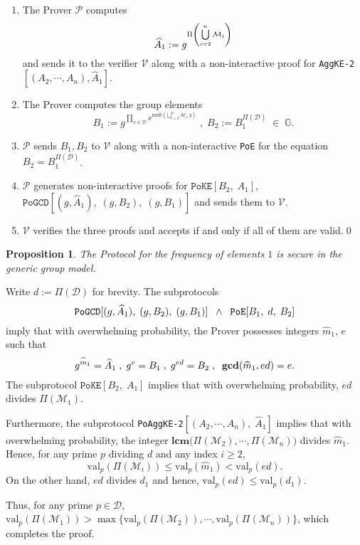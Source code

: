 \documentclass[11pt, lettersize, notitlepage, leqno, footskip=0.6cm]{article}
\newcommand{\pl}{\prod\limits}
\newcommand{\ttt}{\texttt}
\newcommand{\bG}{\mathbb{G}}
\newcommand{\mc}{\mathcal}
\newcommand{\mbf}{\mathbf}
\newcommand{\mr}{\mathrm}
\newcommand{\what}{\widehat}
\newcommand{\mP}{\mc{P}}
\newcommand{\V}{\mc{V}}
\newcommand{\mcM}{\mc{M}}
\newcommand{\vs}{\vspace{-0.15cm}}
\newcommand{\op}{overwhelming probability}
\newcommand{\LCM}{\mbf{lcm}}
\newcommand{\GCD}{\mbf{gcd}}
\newtheorem{Prop}[Thm]{Proposition}
\numberwithin{equation}{section}
\begin{document}
\begin{enumerate}[wide, labelwidth=!, labelindent=0pt] \vs

\item The Prover $\mP$ computes \vs $$\what{A}_1:= g^{\Pi\left(\bigcup\limits_{i=2}^n \mc{M}_i\right)} \vs $$ and sends it to the verifier $\V$ along with a non-interactive proof for \verb|AggKE-2|$[(A_2,\cdots,A_n), \what{A}_1]$. \vs

\item The Prover computes the group elements \vs $$B_1:= g^{\pl_{x\in \mc{D}} x^{\mr{mult\left(\bigcup\limits_{i=2}^n \mc{M}_i, x\right)}}}\;,\;B_2:= B_1^{\Pi(\mc{D})} \;\in\; \bG.$$ \vspace{-0.8cm}

\item $\mP$ sends $B_1, B_2$ to $\V$ along with a non-interactive \verb|PoE| for the equation $B_2= B_1^{\Pi(\mc{D})}$. \vs

\item $\mP$ generates non-interactive proofs for $\ttt{PoKE}[B_2,\;A_1]$, $\ttt{PoGCD}[(g, \what{A}_1),\;(g, B_2),\;(g, B_1)]$ and sends them to $\V$.\vs

\item $\V$ verifies the three proofs and accepts if and only if all of them are valid.\qed\end{enumerate}

\begin{Prop} The Protocol for the frequency of elements $1$ is secure in the generic group model. \end{Prop}

\begin{prf} Write $d:= \Pi(\mc{D})$ for brevity. The subprotocols \vs $$\ttt{PoGCD}[(g, \what{A}_1),\;(g, B_2),\;(g, B_1)]\;\;\wedge \;\;\ttt{PoE}[B_1,\; d,\; B_2] \vs $$ imply that with \op, the Prover possesses integers $\what{m}_1$, $e$ such that \vs $$ g^{\what{m}_1} = \what{A}_1\;,\;g^{e} = B_1\;,\; g^{ed} = B_2\;,\;\;\GCD(\what{m}_1,ed) = e. \vs $$ The subprotocol $\ttt{PoKE}[B_2,\;A_1]$ implies that with \op, $ed$ divides $\Pi(\mcM_1)$. \vspace{0.1cm}

Furthermore, the subprotocol \verb|PoAggKE-2|$[(A_2,\cdots,A_n),\; \what{A}_1]$ implies that with \op, the integer $\LCM\big(\Pi(\mcM_2),\cdots, \Pi(\mcM_n)\big)$ divides $\what{m}_1$. Hence, for any prime $p$ dividing $d$ and any index $i\geq 2$, \vs $$\mr{val}_p(\Pi(\mcM_i))\leq  \mr{val}_p(\what{m}_1) < \mr{val}_p(ed).$$ On the other hand, $ed$ divides $d_1$ and hence, $\mr{val}_p(ed)\leq \mr{val}_p(d_1)$. 

Thus, for any prime $p \in \mc{D}$, $\mr{val}_p(\Pi(\mcM_1))> \max\big\{\mr{val}_p(\Pi(\mcM_2)),\cdots, \mr{val}_p(\Pi(\mcM_n))\big\}$, which completes the proof.\end{prf}
\end{document}

